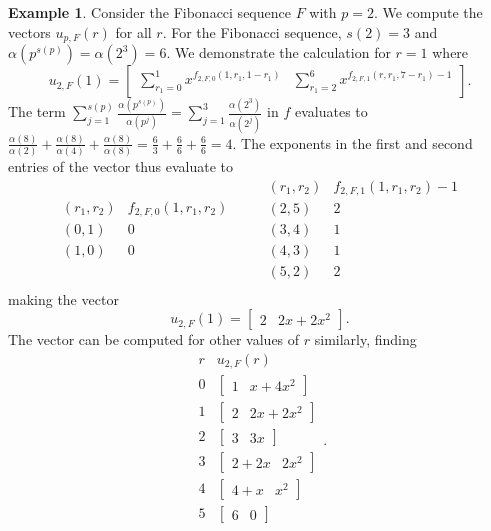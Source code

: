 \documentclass{amsart}
\theoremstyle{definition}
\newtheorem*{example*}{Example}
\begin{document}
\begin{example*}
    Consider the Fibonacci sequence $F$ with $p=2$. We compute the vectors $u_{p,F}(r)$ for all $r$. For the Fibonacci sequence, $s(2)=3$ and $\alpha(p^{s(p)})=\alpha(2^3)=6$. We demonstrate the calculation for $r=1$ where
$$u_{2,F}(1)=\begin{bmatrix}
    \sum\limits_{r_1=0}^{1}x^{f_{2,F,0}(1,r_1,1-r_1)}
    &
    \sum\limits_{r_1=2}^{6}x^{f_{2,F,1}(r,r_1,7-r_1)-1}
\end{bmatrix}.$$
The term $\sum\limits_{j=1}^{s(p)}\frac{\alpha(p^{s(p)})}{\alpha(p^{j})}=\sum\limits_{j=1}^{3}\frac{\alpha(2^{3})}{\alpha\left(2^{j}\right)}$ in $f$ evaluates to $\frac{\alpha(8)}{\alpha(2)}+\frac{\alpha(8)}{\alpha(4)}+\frac{\alpha(8)}{\alpha(8)} = \frac{6}{3}+\frac{6}{6}+\frac{6}{6}=4$. The exponents in the first and second entries of the vector thus evaluate to 
\[
\begin{array}{c|c}
(r_1, r_2) & f_{2,F,0}(1, r_1, r_2) \\
\hline
(0,1) & 0 \\
(1,0) & 0 \\
\end{array}
\quad\quad
\begin{array}{c|c}
(r_1, r_2) & f_{2,F,1}(1, r_1, r_2) -1 \\
\hline
(2,5) & 2 \\
(3,4) & 1 \\
(4,3) & 1 \\
(5,2) & 2 \\
\end{array}
\]
making the vector $$u_{2,F}(1)=\begin{bmatrix}
    2&2x+2x^2
\end{bmatrix}.$$
The vector can be computed for other values of $r$ similarly, finding
\[
\begin{array}{c|c}
r & u_{2,F}(r) \\
\hline
0 & \begin{bmatrix}1&x+4x^2 \end{bmatrix} \\
1 & \begin{bmatrix}2&2x+2x^2 \end{bmatrix} \\
2 & \begin{bmatrix}3&3x\end{bmatrix} \\
3 & \begin{bmatrix}2+2x&2x^2 \end{bmatrix} \\
4 & \begin{bmatrix}4+x&x^2 \end{bmatrix} \\
5 & \begin{bmatrix}6&0 \end{bmatrix} \\
\end{array}.
\] 
\end{example*}
\end{document}
